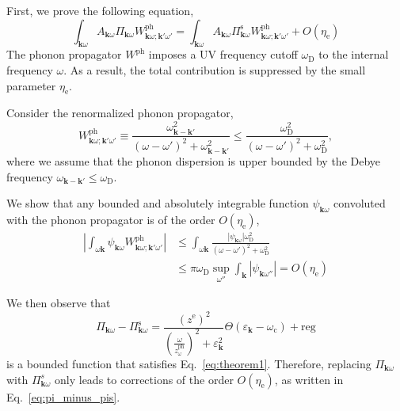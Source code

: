 \documentclass[%
 reprint,
superscriptaddress,
 amsmath,amssymb,
 aps,
prx,
]{revtex4-2}
\newcommand{\bk}{\mathbf{k}}
\newcommand{\txc}{\text{c}}
\newcommand{\txe}{\text{e}}
\newcommand{\txs}{\text{s}}
\newcommand{\txD}{\text{D}}
\newcommand{\txph}{\text{ph}}
\begin{document}
\begin{appendices}
First, we prove the following equation,
\begin{equation}
\label{eq:pi_minus_pis}
    \int_{\bk\omega} A_{\bk\omega}\Pi_{\bk\omega}W^{\txph}_{\bk\omega; \bk'\omega'} = \int_{\bk\omega} A_{\bk\omega}\Pi^{\txs}_{\bk\omega}W^{\txph}_{\bk\omega; \bk'\omega'} + O(\eta_\txe)
\end{equation}
The phonon propagator $W^{\txph}$ imposes a UV frequency cutoff $\omega_\txD$ to the internal frequency $\omega$. As a result, the total contribution is suppressed by the small parameter $\eta_\txe$.



Consider the renormalized phonon propagator,
\begin{equation}
    W^{\txph}_{\bk\omega;\bk'\omega'} \equiv \frac{\omega_{\bk-\bk'}^2}{(\omega-\omega')^2+\omega_{\bk-\bk'}^2}\le \frac{\omega_\txD^2}{(\omega-\omega')^2+\omega_\txD^2},
\end{equation}
where we assume that the phonon dispersion is upper bounded by the Debye frequency $\omega_{\bk-\bk'}\le \omega_\txD$.

We show that any bounded and absolutely integrable function $\psi_{\bk\omega}$ convoluted with the phonon propagator is of the order $O(\eta_\txe)$,
\begin{equation}
\label{eq:theorem1}
\begin{split}
    \left|\int_{\omega\bk} \psi_{\bk\omega}W^{\txph}_{\bk\omega; \bk'\omega'}\right| 
   & \le  \int_{\omega\bk} \frac{\left|\psi_{\bk\omega} \right|\omega_\txD^2}{(\omega-\omega')^2+\omega_\txD^2} \\ 
    &\le \pi \omega_\txD \sup_{\omega''}\int_{\bk} {|\psi_{\bk\omega''}|}   
    =  O(\eta_\txe)
\end{split}
\end{equation}


We then observe that 
\begin{equation}
\label{eq:delta_pi}
    \Pi_{\bk\omega} - \Pi^{\txs}_{\bk\omega} = \frac{\left(z^\text{e}\right)^2}{\left(\frac{\omega}{z^{\txph}_\omega}\right)^2+\varepsilon_{\bk}^2}\Theta(\varepsilon_\bk - \omega_\txc) + \text{reg}
\end{equation}
is a bounded function that satisfies Eq.~\eqref{eq:theorem1}. Therefore, replacing $\Pi_{\bk\omega}$ with $\Pi_{\bk\omega}^s$ only leads to corrections of the order $O(\eta_\txe)$, as written in Eq.~\eqref{eq:pi_minus_pis}.


\end{appendices}
\end{document}
